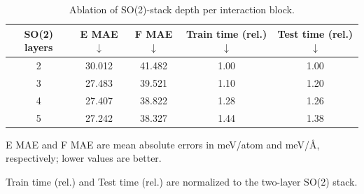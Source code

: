 \begin{table}[ht]
    \PaperTableStyle
    \begin{threeparttable}
        \caption{Ablation of SO(2)-stack depth per interaction block.}
        \label{tab:sm_so2_stack}
        \begin{tabular*}{\linewidth}{@{\extracolsep{\fill}}ccccc@{}}
        \toprule
        \textbf{SO(2) layers}             &
        \textbf{E MAE}$\downarrow$\tnote{a} &
        \textbf{F MAE}$\downarrow$\tnote{a} &
        \textbf{Train time (rel.)}$\downarrow$\tnote{b} &
        \textbf{Test time (rel.)}$\downarrow$\tnote{b}                  \\
        \midrule
        2                                 & 30.012 & 41.482 & 1.00 & 1.00 \\
        3                                 & 27.483 & 39.521 & 1.10 & 1.20 \\
        4                                 & 27.407 & 38.822 & 1.28 & 1.26 \\
        5                                 & 27.242 & 38.327 & 1.44 & 1.38 \\
        \bottomrule
        \end{tabular*}
        \begin{tablenotes}[flushleft]
            \PaperTableNotesStyle
            \item[a] E MAE and F MAE are mean absolute errors in meV/atom and meV/\AA, respectively; lower values are better.
            \item[b] Train time (rel.) and Test time (rel.) are normalized to the two-layer SO(2) stack.
        \end{tablenotes}
    \end{threeparttable}
\end{table}

